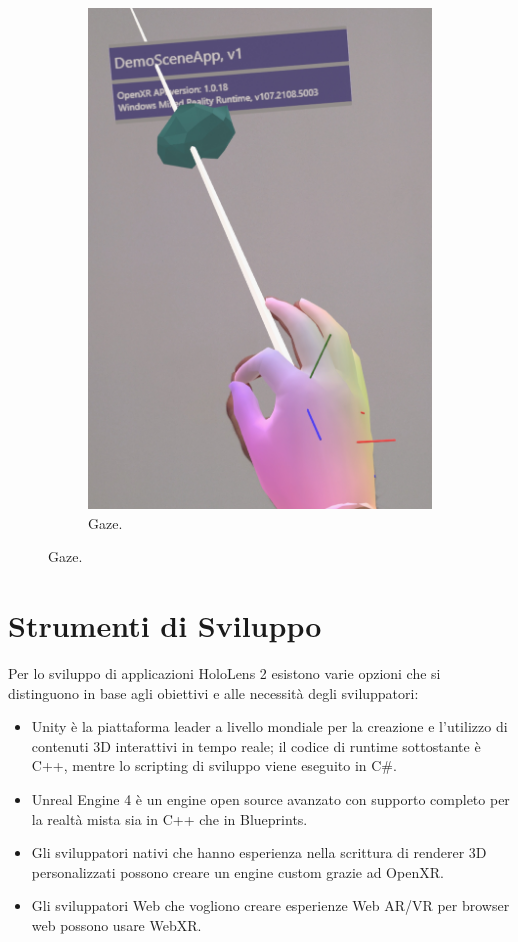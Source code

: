 \begin{figure}[H]
\begin{subfigure}{0.4\textwidth}
        \includegraphics[width=\textwidth]{images/gaze.jpg}
        \caption{Gaze.}
        \label{fig:figure24b}
    \end{subfigure}
    \label{fig:figure24}
\end{figure}

\section{Strumenti di Sviluppo}\label{sec:Sezione2.3}
Per lo sviluppo di applicazioni HoloLens 2 esistono varie opzioni che si distinguono in base agli obiettivi e alle necessità degli sviluppatori:

\begin{itemize}
\item Unity è la piattaforma leader a livello mondiale per la creazione e l'utilizzo di contenuti 3D interattivi in tempo reale; il codice di runtime sottostante è C++, mentre lo scripting di sviluppo viene eseguito in C\#.
\item Unreal Engine 4 è un engine open source avanzato con supporto completo per la realtà mista sia in C++ che in Blueprints. 
\item Gli sviluppatori nativi che hanno esperienza nella scrittura di renderer 3D personalizzati possono creare un engine custom grazie ad OpenXR.
\item Gli sviluppatori Web che vogliono creare esperienze Web AR/VR per browser web possono usare WebXR.
\end{itemize}

